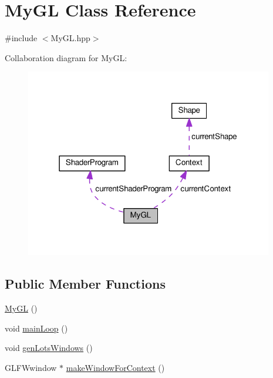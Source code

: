 \hypertarget{classMyGL}{}\section{My\+GL Class Reference}
\label{classMyGL}


{\ttfamily \#include $<$My\+G\+L.\+hpp$>$}



Collaboration diagram for My\+GL\+:\nopagebreak
\begin{figure}[H]
\begin{center}
\leavevmode
\includegraphics[width=307pt]{classMyGL__coll__graph}
\end{center}
\end{figure}
\subsection*{Public Member Functions}
\begin{DoxyCompactItemize}
\item 
\hyperlink{classMyGL_abb621dca31a152540b416deadf23037c}{My\+GL} ()
\item 
void \hyperlink{classMyGL_a4c37ec888e514cc8d06b7bc0ea7e73bd}{main\+Loop} ()
\item 
void \hyperlink{classMyGL_af7fa10909864af7f8417cf12553ba456}{gen\+Lots\+Windows} ()
\item 
G\+L\+F\+Wwindow $\ast$ \hyperlink{classMyGL_a9f2cc53d2c05eceb1d433bb0b19d9db8}{make\+Window\+For\+Context} ()
\end{DoxyCompactItemize}
